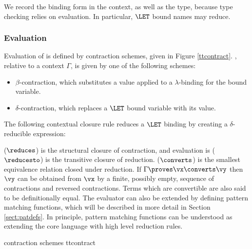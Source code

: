 \noindent
We record the binding form in the context, as well as the type,
because type checking relies on evaluation. In particular, $\LET$ bound
names may reduce.

\subsubsection{Evaluation}

\label{sect:evaluation}

Evaluation of \TT{} is defined by contraction schemes, given in Figure
\ref{ttcontract}. , relative to a context $\Gamma$, is given
by one of the following schemes:

\begin{itemize}
\item $\beta$-contraction, which substitutes a value applied to a $\lambda$-binding for
the bound variable. 
\item $\delta$-contraction, which replaces a $\LET$ bound variable with its value.
\end{itemize}

\noindent
The following contextual closure rule reduces a $\LET$ binding by creating
a $\delta$-reducible expression:


 ($\reduces$) is the structural closure of contraction, and evaluation
is ($\reducesto$) is the transitive closure of reduction.  ($\converts$)
is the smallest equivalence relation closed under reduction. If $\Gamma\proves\vx\converts\vy$
then $\vy$ can be obtained from $\vx$ by a finite, possibly empty, sequence of
contractions and reversed contractions. Terms which are convertible are also said to
be definitionally equal.
The evaluator can also be extended by defining pattern matching functions, which
will be described in more detail in Section \ref{sect:patdefs}. In principle, pattern
matching functions can be understood as extending the core language with high level
reduction rules.

{\TT{} contraction schemes}
{ttcontract}



